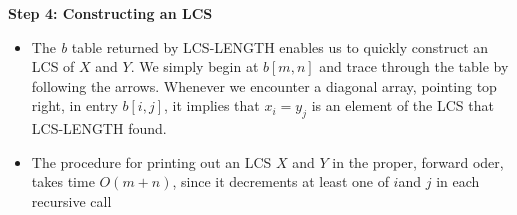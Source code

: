 \documentclass{report}
\begin{document}
\textbf{Step 4: Constructing an LCS}
\begin{itemize}
    \item The \textit{b} table returned by LCS-LENGTH enables us to quickly construct an LCS of $X$ and $Y$. We simply begin at $b[m, n]$ and trace through the table by following the arrows. Whenever we encounter a diagonal array, pointing top right, in entry $b[i, j]$, it implies that $x_i = y_j$ is an element of the LCS that LCS-LENGTH found.
    \item The procedure for printing out an LCS $X$ and $Y$ in the proper, forward oder, takes time $O(m + n)$, since it decrements at least one of $i$and $j$ in each recursive call
\end{itemize}
\end{document}
